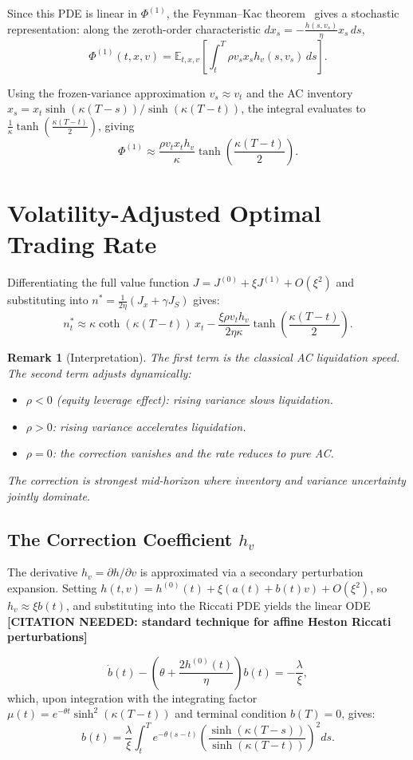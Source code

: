 \documentclass[11pt]{article}
\newtheorem{remark}[theorem]{Remark}
\newcommand{\needscite}[1]{%
  {\color{red}\textbf{[CITATION NEEDED: #1]}}%
}
\begin{document}
Since this PDE is linear in $\Phi^{(1)}$, the Feynman--Kac
theorem~\cite{karatzas1998brownian} gives a stochastic representation:
along the zeroth-order characteristic $dx_s = -\frac{h(s,v_s)}{\eta}x_s\,ds$,
\[
\boxed{
\Phi^{(1)}(t,x,v)
=
\mathbb{E}_{t,x,v}
\left[
\int_t^T
\rho v_sx_sh_v(s,v_s)
\,ds
\right].
}
\]

Using the frozen-variance approximation $v_s \approx v_t$ and the AC inventory
$x_s = x_t \sinh(\kappa(T-s))/\sinh(\kappa(T-t))$, the integral evaluates to
$\frac{1}{\kappa}\tanh\!\left(\frac{\kappa(T-t)}{2}\right)$, giving
\[
\Phi^{(1)} \approx
\frac{\rho v_tx_th_v}{\kappa}
\tanh\!\left(\frac{\kappa(T-t)}{2}\right).
\]

\section{Volatility-Adjusted Optimal Trading Rate}

Differentiating the full value function $J = J^{(0)} + \xi J^{(1)} + O(\xi^2)$
and substituting into $n^* = \frac{1}{2\eta}(J_x + \gamma J_S)$ gives:
\[
\boxed{
n_t^*
\approx
\kappa\coth(\kappa(T-t))\,x_t
-
\frac{\xi\rho v_t h_v}{2\eta\kappa}
\tanh\!\left(\frac{\kappa(T-t)}{2}\right).
}
\]

\begin{remark}[Interpretation]
The first term is the classical AC liquidation speed. The second term adjusts dynamically:
\begin{itemize}
\item $\rho < 0$ (equity leverage effect): rising variance \emph{slows} liquidation.
\item $\rho > 0$: rising variance \emph{accelerates} liquidation.
\item $\rho = 0$: the correction vanishes and the rate reduces to pure AC.
\end{itemize}
The correction is strongest mid-horizon where inventory and variance uncertainty jointly dominate.
\end{remark}

\subsection{The Correction Coefficient \texorpdfstring{$h_v$}{hv}}

The derivative $h_v = \partial h/\partial v$ is approximated via a secondary perturbation
expansion.  Setting $h(t,v) = h^{(0)}(t) + \xi(a(t) + b(t)v) + O(\xi^2)$, so
$h_v \approx \xi b(t)$, and substituting into the Riccati PDE yields the
linear ODE~\needscite{standard technique for affine Heston Riccati perturbations}
\[
\dot{b}(t) - \left(\theta + \frac{2h^{(0)}(t)}{\eta}\right)b(t) = -\frac{\lambda}{\xi},
\]
which, upon integration with the integrating factor
$\mu(t) = e^{-\theta t}\sinh^2(\kappa(T-t))$
and terminal condition $b(T) = 0$, gives:
\[
\boxed{
b(t) = \frac{\lambda}{\xi}
\int_t^T e^{-\theta(s-t)}
\left(\frac{\sinh(\kappa(T-s))}{\sinh(\kappa(T-t))}\right)^2 ds.
}
\]
\end{document}
